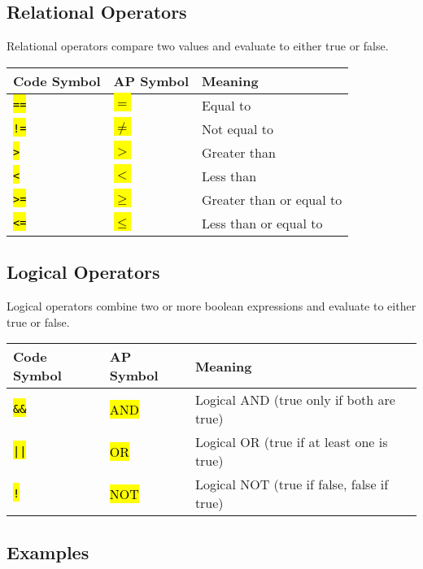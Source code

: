 \documentclass{article}
\newcommand{\hlc}[2][yellow]{ {\sethlcolor{#1} \hl{#2}} }
\begin{document}
\subsection*{Relational Operators}

Relational operators compare two values and evaluate to either true or false.

\begin{tabular}{l|l|l}
\toprule
\textbf{Code Symbol} & \textbf{AP Symbol} & \textbf{Meaning} \\
\midrule
\hlc[yellow!40]{\texttt{==}} & \hlc[yellow!40]{$=$} & Equal to \\
\hlc[yellow!40]{\texttt{!=}} & \hlc[yellow!40]{$\neq$} & Not equal to \\
\hlc[yellow!40]{\texttt{>}} & \hlc[yellow!40]{$>$} & Greater than \\
\hlc[yellow!40]{\texttt{<}} & \hlc[yellow!40]{$<$} & Less than \\
\hlc[yellow!40]{\texttt{>=}} & \hlc[yellow!40]{$\geq$} & Greater than or equal to \\
\hlc[yellow!40]{\texttt{<=}} & \hlc[yellow!40]{$\leq$} & Less than or equal to \\
\bottomrule
\end{tabular}

\subsection*{Logical Operators}

Logical operators combine two or more boolean expressions and evaluate to either true or false.

\begin{tabular}{l|l|l}
\toprule
\textbf{Code Symbol} & \textbf{AP Symbol} & \textbf{Meaning} \\
\midrule
\hlc[red!20]{\texttt{\&\&}} & \hlc[red!20]{AND} & Logical AND (true only if both are true) \\
\hlc[red!20]{\texttt{||}} & \hlc[red!20]{OR} & Logical OR (true if at least one is true) \\
\hlc[red!20]{\texttt{!}} & \hlc[red!20]{NOT} & Logical NOT (true if false, false if true) \\
\bottomrule
\end{tabular}



\subsection*{Examples}
\end{document}
